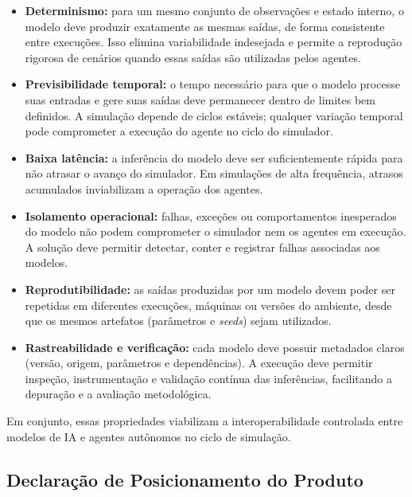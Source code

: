 \begin{itemize}

    \item \textbf{Determinismo:} para um mesmo conjunto de observações e estado interno, o modelo deve produzir exatamente as mesmas saídas, de forma consistente entre execuções. Isso elimina variabilidade indesejada e permite a reprodução rigorosa de cenários quando essas saídas são utilizadas pelos agentes.

    \item \textbf{Previsibilidade temporal:} o tempo necessário para que o modelo processe suas entradas e gere suas saídas deve permanecer dentro de limites bem definidos. A simulação depende de ciclos estáveis; qualquer variação temporal pode comprometer a execução do agente no ciclo do simulador.

    \item \textbf{Baixa latência:} a inferência do modelo deve ser suficientemente rápida para não atrasar o avanço do simulador. Em simulações de alta frequência, atrasos acumulados inviabilizam a operação dos agentes.

    \item \textbf{Isolamento operacional:} falhas, exceções ou comportamentos inesperados do modelo não podem comprometer o simulador nem os agentes em execução. A solução deve permitir detectar, conter e registrar falhas associadas aos modelos.

    \item \textbf{Reprodutibilidade:} as saídas produzidas por um modelo devem poder ser repetidas em diferentes execuções, máquinas ou versões do ambiente, desde que os mesmos artefatos (parâmetros e \emph{seeds}) sejam utilizados.

    \item \textbf{Rastreabilidade e verificação:} cada modelo deve possuir metadados claros (versão, origem, parâmetros e dependências). A execução deve permitir inspeção, instrumentação e validação contínua das inferências, facilitando a depuração e a avaliação metodológica.

\end{itemize}

Em conjunto, essas propriedades viabilizam a interoperabilidade controlada entre modelos de IA e agentes autônomos no ciclo de simulação.

\subsection{Declaração de Posicionamento do Produto}

